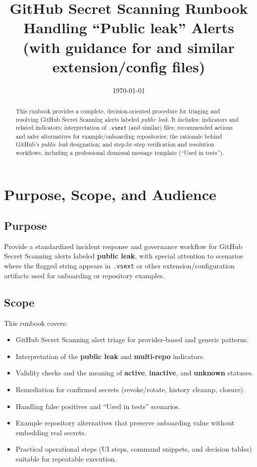 \documentclass[11pt]{article}
\title{\textbf{GitHub Secret Scanning Runbook}\\
\large Handling ``Public leak'' Alerts (with guidance for \code{.vsext} and similar extension/config files)}
\author{%
}
\date{\today}
\newcommand{\term}[1]{\textbf{#1}}
\newcommand{\code}[1]{\texttt{#1}}
\begin{document}
\maketitle

\begin{abstract}
This runbook provides a complete, decision-oriented procedure for triaging and resolving GitHub Secret Scanning alerts labeled \emph{public leak}. It includes: indicators and related indicators; interpretation of \code{.vsext} (and similar) files; recommended actions and safer alternatives for example/onboarding repositories; the rationale behind GitHub's \emph{public leak} designation; and step-by-step verification and resolution workflows, including a professional dismissal message template (``Used in tests'').
\end{abstract}

\tableofcontents
\newpage

\section{Purpose, Scope, and Audience}
\subsection{Purpose}
Provide a standardized incident response and governance workflow for GitHub Secret Scanning alerts labeled \term{public leak}, with special attention to scenarios where the flagged string appears in \code{.vsext} or other extension/configuration artifacts used for onboarding or repository examples.

\subsection{Scope}
This runbook covers:
\begin{itemize}
  \item GitHub Secret Scanning alert triage for provider-based and generic patterns.
  \item Interpretation of the \term{public leak} and \term{multi-repo} indicators.
  \item Validity checks and the meaning of \term{active}, \term{inactive}, and \term{unknown} statuses.
  \item Remediation for confirmed secrets (revoke/rotate, history cleanup, closure).
  \item Handling false positives and ``Used in tests'' scenarios.
  \item Example repository alternatives that preserve onboarding value without embedding real secrets.
  \item Practical operational steps (UI steps, command snippets, and decision tables) suitable for repeatable execution.
\end{itemize}
\end{document}
